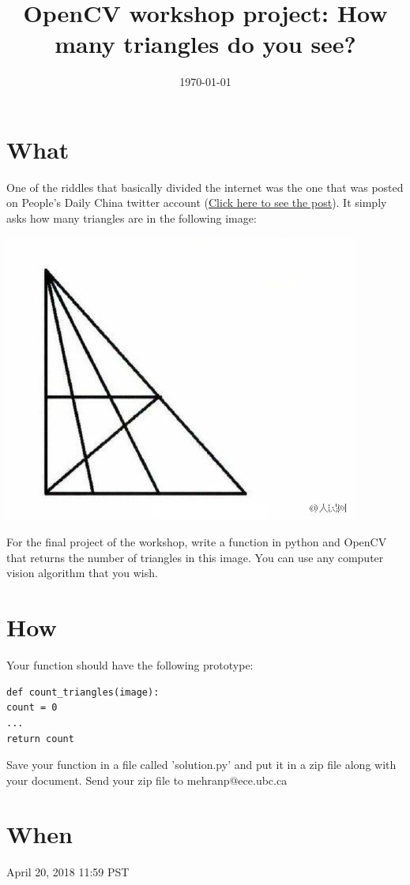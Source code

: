 \documentclass[11pt]{article}
\date{\today}
\title{OpenCV workshop project: How many triangles do you see?}
\begin{document}
\maketitle

\section{What}
\label{sec:org275de49}
One of the riddles that basically divided the internet was the one that was posted on People's Daily China twitter account (\href{https://twitter.com/PDChina/status/806615066133090308/photo/1?ref\_src=twsrc\%255Etfw\&ref\_url=https\%253A\%252F\%252Fwww.telegraph.co.uk\%252Fnews\%252F2016\%252F12\%252F08\%252Fmany-triangles-can-see-puzzle-divides-internet\%252F}{Click here to see the post}).
It simply asks how many triangles are in the following image:
\begin{center}
\includegraphics[width=.9\linewidth]{./final.jpeg}
\end{center}

For the final project of the workshop, write a function in python and OpenCV that returns the number of triangles in this image. You can use any computer vision algorithm that you wish.

\section{How}
\label{sec:org81d343a}
Your function should have the following prototype:

\begin{verbatim}
def count_triangles(image):
count = 0
...
return count 
\end{verbatim}

Save your function in a file called 'solution.py' and put it in a zip file along with your document.
Send your zip file to mehranp@ece.ubc.ca

\section{When}
\label{sec:org290b5db}
April 20, 2018 11:59 PST
\end{document}
